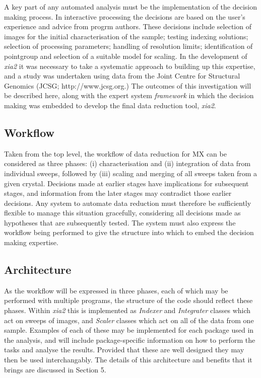 \documentclass[preprint,pdf]{iucr}
\begin{document}
A key part of any automated analysis must be the implementation of the
decision making process. In interactive processing the decisions are
based on the user's experience and advice from progrm authors. These
decisions include selection of images for the initial characterisation
of the sample; testing indexing solutions; selection of processing
parameters; handling of resolution limits; identification of pointgroup and
selection of a suitable model for scaling. In the development of
\emph{xia2} it was necessary to take a systematic approach to building
up this expertise, and a study was undertaken using data from the
Joint Centre
for Structural Genomics (JCSG; http://www.jcsg.org.) The
outcomes of this investigation will be described here, along with the
expert system \emph{framework} in which the decision making was
embedded to develop the final data reduction tool, \emph{xia2}.

\subsection{Workflow}

Taken from the top level, the workflow of data reduction for MX
can be considered as three phases:
(i) characterisation and (ii) integration of data from individual sweeps,
followed by (iii) scaling and merging of all sweeps taken from a given
crystal. Decisions made at earlier stages have implications for
subsequent stages, and information from the later stages may
contradict those earlier decisions. Any system to automate data
reduction must therefore be sufficiently flexible to manage this
situation gracefully, considering all decisions made as hypotheses
that are subsequently tested. The system must also express the workflow being
performed to give the structure into which to embed the decision
making expertise.

\subsection{Architecture}

As the workflow will be expressed in three phases, each of which may
be performed with multiple programs, the structure of the code should
reflect these phases. Within \emph{xia2} this is implemented as
\emph{Indexer} and \emph{Integrater} classes which act on sweeps of
images, and \emph{Scaler} classes which act on all of the data from
one sample. Examples of each of these may be implemented for each
package used in the analysis, and will include package-specific
information on how to perform the tasks and analyse the
results. Provided that these are well designed they may then be used
interchangably. The details of this architecture and benefits that it
brings are discussed in Section 5.
\end{document}
